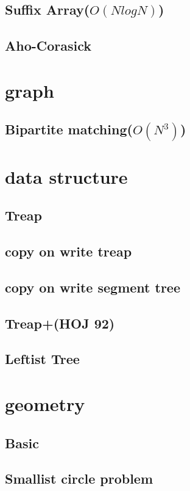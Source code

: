 \documentclass[12pt,twocolumn,oneside]{article}
\begin{document}
\subsection{Suffix Array(\(O(N log N)\))}


\subsection{Aho-Corasick}


\section{graph}
\subsection{Bipartite matching(\(O(N^3)\))}


\section{data structure}
\subsection{Treap}


\subsection{copy on write treap}


\subsection{copy on write segment tree}


\subsection{Treap+(HOJ 92)}


\subsection{Leftist Tree}


\section{geometry}
\subsection{Basic}


\subsection{Smallist circle problem}

\end{document}
